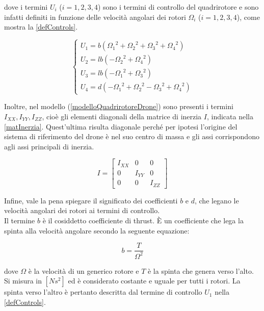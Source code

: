 dove i termini $U_i$ ($i = 1,2,3,4$) sono i termini di controllo del quadrirotore e sono infatti definiti in funzione delle velocità angolari dei rotori $\Omega_i$ ($i = 1,2,3,4$), come mostra la \ref{defControls}.

\begin{equation}
	\begin{cases}
	U_1 = b({\Omega_1}^2 + {\Omega_2}^2 + {\Omega_3}^2 + {\Omega_4}^2) \\
	U_2 = lb(- {\Omega_2}^2 + {\Omega_4}^2) \\
	U_3 = lb(- {\Omega_1}^2 + {\Omega_3}^2) \\
	U_4 = d(- {\Omega_1}^2 + {\Omega_2}^2 - {\Omega_3}^2 + {\Omega_4}^2)
	\end{cases}
	\label{defControls}
\end{equation}

Inoltre, nel modello (\ref{modelloQuadrirotoreDrone}) sono presenti i termini $I_{XX}, I_{YY}, I_{ZZ}$, cioè gli elementi diagonali della matrice di inerzia $I$, indicata nella \ref{matInerzia}. Quest'ultima risulta diagonale perché per ipotesi l'origine del sistema di riferimento del drone è nel suo centro di massa e gli assi corrispondono agli assi principali di inerzia.
 
\begin{equation}
I =
\begin{bmatrix}
I_{XX} & 0 & 0\\
0 & I_{YY} & 0\\
0 & 0 & I_{ZZ}
\end{bmatrix}
\label{matInerzia}
\end{equation}

Infine, vale la pena spiegare il significato dei coefficienti $b$ e $d$, che legano le velocità angolari dei rotori ai termini di controllo.\\

Il termine $b$ è il cosiddetto coefficiente di thrust. È un coefficiente che lega la spinta alla velocità angolare secondo la seguente equazione:

\begin{equation}
	b = \frac{T}{\Omega^2}
	\label{thrustCoeff}
\end{equation}

dove $\Omega$ è la velocità di un generico rotore e $T$ è la spinta che genera verso l'alto. Si misura in $[N s^2]$ ed è considerato costante e uguale per tutti i rotori. La spinta verso l'altro è pertanto descritta dal termine di controllo $U_1$ nella \ref{defControls}.\\

